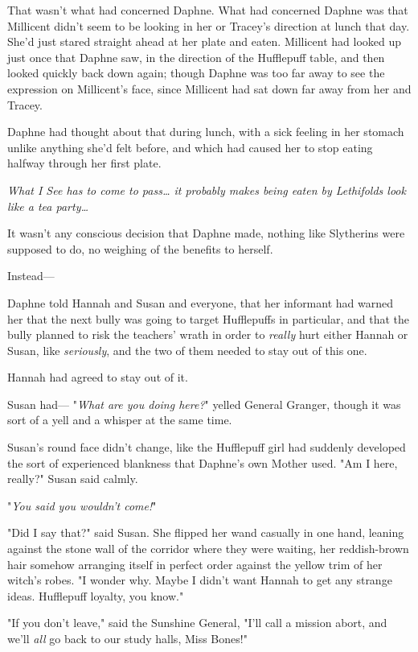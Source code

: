 That wasn't what had concerned Daphne. What had concerned Daphne was that 
Millicent didn't seem to be looking in her or Tracey's direction at lunch that 
day. She'd just stared straight ahead at her plate and eaten. Millicent had 
looked up just once that Daphne saw, in the direction of the Hufflepuff table, 
and then looked quickly back down again; though Daphne was too far away to see 
the expression on Millicent's face, since Millicent had sat down far away from 
her and Tracey.

Daphne had thought about that during lunch, with a sick feeling in her stomach 
unlike anything she'd felt before, and which had caused her to stop eating 
halfway through her first plate.

\emph{What I See has to come to pass{\ldots} it probably makes being eaten by 
Lethifolds look like a tea party{\ldots}}

It wasn't any conscious decision that Daphne made, nothing like Slytherins were 
supposed to do, no weighing of the benefits to herself.

Instead---

Daphne told Hannah and Susan and everyone, that her informant had warned her 
that the next bully was going to target Hufflepuffs in particular, and that the 
bully planned to risk the teachers' wrath in order to \emph{really} hurt either 
Hannah or Susan, like \emph{seriously}, and the two of them needed to stay out 
of this one.

Hannah had agreed to stay out of it.

Susan had---
\sbreak
"\emph{What are you doing here?}" yelled General Granger, though it was sort of 
a yell and a whisper at the same time.

Susan's round face didn't change, like the Hufflepuff girl had suddenly 
developed the sort of experienced blankness that Daphne's own Mother used. "Am 
I here, really?" Susan said calmly.

"\emph{You said you wouldn't come!}"

"Did I say that?" said Susan. She flipped her wand casually in one hand, 
leaning against the stone wall of the corridor where they were waiting, her 
reddish-brown hair somehow arranging itself in perfect order against the yellow 
trim of her witch's robes. "I wonder why. Maybe I didn't want Hannah to get any 
strange ideas. Hufflepuff loyalty, you know."

"If you don't leave," said the Sunshine General, "I'll call a mission abort, 
and we'll \emph{all} go back to our study halls, Miss Bones!"

